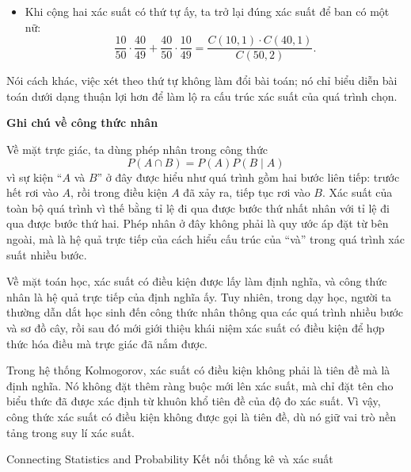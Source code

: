 {\begin{itemize}
      \item Khi cộng hai xác suất có thứ tự ấy, ta trở lại đúng xác suất để ban có một nữ:
      $$
      \frac{10}{50}\cdot\frac{40}{49}+\frac{40}{50}\cdot\frac{10}{49}
      = \frac{C(10,1)\cdot C(40,1)}{C(50,2)}.
      $$
    \end{itemize}

    \noindent
    Nói cách khác, việc xét theo thứ tự không làm đổi bài toán; nó chỉ biểu diễn bài toán dưới dạng thuận lợi hơn để làm lộ ra cấu trúc xác suất của quá trình chọn.

    \noindent
    \textbf{Ghi chú về công thức nhân}\vspace{\baselineskip}

    Về mặt trực giác, ta dùng phép nhân trong công thức
    $$
    P(A\cap B)=P(A)P(B\mid A)
    $$
    vì sự kiện ``$A$ và $B$'' ở đây được hiểu như quá trình gồm hai bước liên tiếp: trước hết rơi vào $A$, rồi trong điều kiện $A$ đã xảy ra, tiếp tục rơi vào $B$. Xác suất của toàn bộ quá trình vì thế bằng tỉ lệ đi qua được bước thứ nhất nhân với tỉ lệ đi qua được bước thứ hai. Phép nhân ở đây không phải là quy ước áp đặt từ bên ngoài, mà là hệ quả trực tiếp của cách hiểu cấu trúc của ``và'' trong quá trình xác suất nhiều bước.

    Về mặt toán học, xác suất có điều kiện được lấy làm định nghĩa, và công thức nhân là hệ quả trực tiếp của định nghĩa ấy. Tuy nhiên, trong dạy học, người ta thường dẫn dắt học sinh đến công thức nhân thông qua các quá trình nhiều bước và sơ đồ cây, rồi sau đó mới giới thiệu khái niệm xác suất có điều kiện để hợp thức hóa điều mà trực giác đã nắm được.

    Trong hệ thống Kolmogorov, xác suất có điều kiện không phải là tiên đề mà là định nghĩa. Nó không đặt thêm ràng buộc mới lên xác suất, mà chỉ đặt tên cho biểu thức đã được xác định từ khuôn khổ tiên đề của độ đo xác suất. Vì vậy, công thức xác suất có điều kiện không được gọi là tiên đề, dù nó giữ vai trò nền tảng trong suy lí xác suất.
  }

\ParallelSection
  {Connecting Statistics and Probability}
  {Kết nối thống kê và xác suất}
  {}

